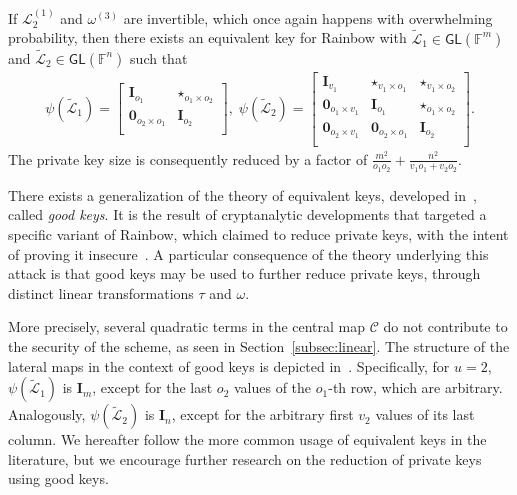 \documentclass[english]{ufsc-thesis-rn46-2019/ufsc-thesis-rn46-2019}
\theoremstyle{definition}
\begin{document}
If $\mathcal{L}_{2}^{(1)}$ and $\omega^{(3)}$ are invertible, which once again
happens with overwhelming probability, then there exists an equivalent key for
Rainbow with $\widetilde{\mathcal{L}}_{1} \in \mathsf{GL}(\mathbb{F}^{m})$ and
$\widetilde{\mathcal{L}}_{2} \in \mathsf{GL}(\mathbb{F}^{n})$ such that
\begin{align}
  \psi(\widetilde{\mathcal{L}}_{1}) =
  \begin{bmatrix}
    \mathbf{I}_{o_{1}}              & \star_{o_{1} \times o_{2}} \\
    \mathbf{0}_{o_{2} \times o_{1}} & \mathbf{I}_{o_{2}} \\
  \end{bmatrix},\;
  \psi(\widetilde{\mathcal{L}}_{2}) =
  \begin{bmatrix}
    \mathbf{I}_{v_{1}}              & \star_{v_{1} \times o_{1}}
      & \star_{v_{1} \times o_{2}}  \\
    \mathbf{0}_{o_{1} \times v_{1}} & \mathbf{I}_{o_{1}}
      & \star_{o_{1} \times o_{2}}  \\
    \mathbf{0}_{o_{2} \times v_{1}} & \mathbf{0}_{o_{2} \times o_{1}}
      & \mathbf{I}_{o_{2}}          \\
  \end{bmatrix}.
\end{align}
The private key size is consequently reduced by a factor of
$\frac{m^{2}}{o_{1} o_{2}} + \frac{n^{2}}{v_{1} o_{1} + v_{2} o_{2}}$.

There exists a generalization of the theory of equivalent keys, developed
in~\cite{Thomae:201306}, called \emph{good keys}. It is the result of
cryptanalytic developments that targeted a specific variant of Rainbow, which
claimed to reduce private keys, with the intent of proving it
insecure~\cite{Thomae:201207}. A particular consequence of the theory
underlying this attack is that good keys may be used to further reduce private
keys, through distinct linear transformations $\tau$ and $\omega$.

More precisely, several quadratic terms in the central map $\mathcal{C}$ do not
contribute to the security of the scheme, as seen in
Section~\ref{subsec:linear}. The structure of the lateral maps in the context
of good keys is depicted in~\cite[Fig.~3]{Shim:202001}. Specifically, for
$u = 2$, $\psi(\widetilde{\mathcal{L}}_{1})$ is $\mathbf{I}_{m}$, except for
the last $o_{2}$ values of the $o_{1}$-th row, which are
arbitrary. Analogously, $\psi(\widetilde{\mathcal{L}}_{2})$ is
$\mathbf{I}_{n}$, except for the arbitrary first $v_{2}$ values of its last
column. We hereafter follow the more common usage of equivalent keys in the
literature, but we encourage further research on the reduction of private keys
using good keys.
\end{document}
